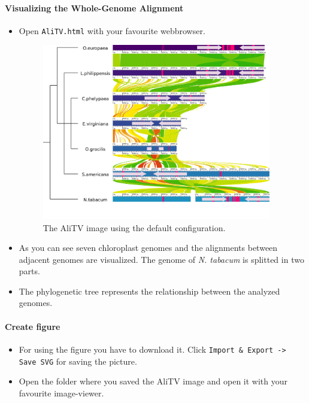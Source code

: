 \documentclass[a4paper]{scrartcl}
\begin{document}
\paragraph*{Visualizing the Whole-Genome Alignment}
\begin{itemize}
	\item Open \texttt{AliTV.html} with your favourite webbrowser.
		
	\begin{figure}[H]
		\centering
		\includegraphics[width=10cm]{showLabels.png}
		\caption{The AliTV image using the default configuration.}
	\end{figure}
	
	\item As you can see seven chloroplast genomes and the alignments between adjacent genomes are visualized. The genome of \textit{N. tabacum} is splitted in two parts. 
	\item The phylogenetic tree represents the relationship between the analyzed genomes.
\end{itemize}

\paragraph*{Create figure}
\begin{itemize}
	\item For using the figure you have to download it. Click \texttt{Import \& Export -> Save SVG} for saving the picture.
	\item Open the folder where you saved the AliTV image and open it with your favourite image-viewer.
\end{itemize}
\end{document}
